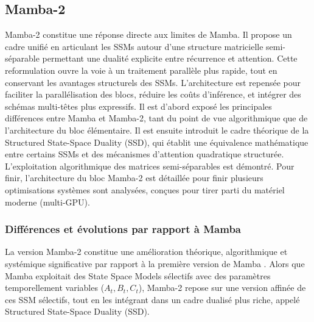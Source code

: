 \subsection{Mamba-2}

Mamba-2 constitue une réponse directe aux limites de Mamba. Il propose un cadre unifié en articulant les SSMs autour d’une structure matricielle semi-séparable permettant une dualité explicite entre récurrence et attention. Cette reformulation ouvre la voie à un traitement parallèle plus rapide, tout en conservant les avantages structurels des SSMs. L’architecture est repensée pour faciliter la parallélisation des blocs, réduire les coûts d’inférence, et intégrer des schémas multi-têtes plus expressifs. Il est d'abord exposé les principales différences entre Mamba et Mamba-2, tant du point de vue algorithmique que de l’architecture du bloc élémentaire. Il est ensuite introduit le cadre théorique de la Structured State-Space Duality (SSD), qui établit une équivalence mathématique entre certains SSMs et des mécanismes d’attention quadratique structurée. L’exploitation algorithmique des matrices semi-séparables est démontré. Pour finir, l’architecture du bloc Mamba-2 est détaillée pour finir plusieurs optimisations systèmes sont analysées, conçues pour tirer parti du matériel moderne (multi-GPU).

\subsubsection{Différences et évolutions par rapport à Mamba}

La version Mamba-2 \citep{dao2024mamba2} constitue une amélioration théorique, algorithmique et systémique significative par rapport à la première version de Mamba \citep{gu2023mamba}. Alors que Mamba exploitait des State Space Models sélectifs avec des paramètres temporellement variables ($A_t, B_t, C_t$), Mamba-2 repose sur une version affinée de ces SSM sélectifs, tout en les intégrant dans un cadre dualisé plus riche, appelé Structured State-Space Duality (SSD).\\

